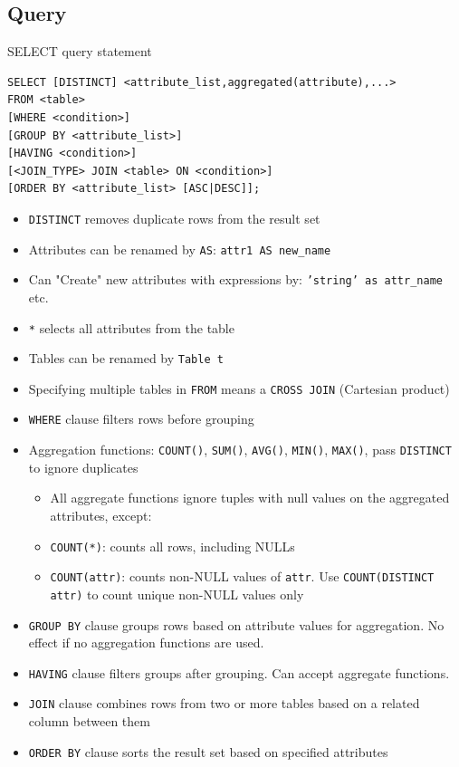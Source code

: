 \subsection{Query}

\begin{definition}
    {SELECT query statement}
    \begin{verbatim}
SELECT [DISTINCT] <attribute_list,aggregated(attribute),...>
FROM <table>
[WHERE <condition>]
[GROUP BY <attribute_list>]
[HAVING <condition>]
[<JOIN_TYPE> JOIN <table> ON <condition>]
[ORDER BY <attribute_list> [ASC|DESC]];
    \end{verbatim}

    \begin{itemize}
        \item \texttt{DISTINCT} removes duplicate rows from the result set
        \item Attributes can be renamed by \texttt{AS}: \texttt{attr1 AS new\_name}
        \item Can "Create" new attributes with expressions by: \texttt{'string' as attr\_name} etc.
        \item \texttt{*} selects all attributes from the table
        \item Tables can be renamed by \texttt{Table t}
        \item Specifying multiple tables in \texttt{FROM} means a \texttt{CROSS JOIN} (Cartesian product)
        \item \texttt{WHERE} clause filters rows before grouping
        \item Aggregation functions: \texttt{COUNT()}, \texttt{SUM()}, \texttt{AVG()}, \texttt{MIN()}, \texttt{MAX()}, pass \texttt{DISTINCT} to ignore duplicates
              \begin{itemize}
                  \item All aggregate functions ignore tuples with null values on the aggregated attributes, except:
                  \item \texttt{COUNT(*)}: counts all rows, including NULLs
                  \item \texttt{COUNT(attr)}: counts non-NULL values of \texttt{attr}. Use \texttt{COUNT(DISTINCT attr)} to count unique non-NULL values only
              \end{itemize}
        \item \texttt{GROUP BY} clause groups rows based on attribute values for aggregation. No effect if no aggregation functions are used.
        \item \texttt{HAVING} clause filters groups after grouping. Can accept aggregate functions.
        \item \texttt{JOIN} clause combines rows from two or more tables based on a related column between them
        \item \texttt{ORDER BY} clause sorts the result set based on specified attributes
    \end{itemize}
\end{definition}

